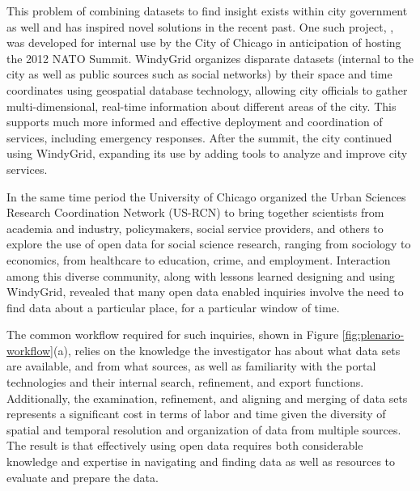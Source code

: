 \documentclass[11pt]{article}
\begin{document}
This problem of combining datasets to find insight exists within city government as well and has inspired novel solutions in the recent past. One such project, \cite{windygrid}, was developed for internal use by the City of Chicago in anticipation of hosting the 2012 NATO Summit. WindyGrid organizes disparate datasets (internal to the city as well as public sources such as social networks) by their space and time coordinates using geospatial database technology, allowing city officials to gather multi-dimensional, real-time information about different areas of the city. This supports much more informed and effective deployment and coordination of services, including emergency responses. After the summit, the city continued using WindyGrid, expanding its use by adding tools to analyze and improve city services.

In the same time period the University of Chicago \cite{urbanccd} organized the Urban Sciences Research Coordination Network (US-RCN) \cite{us-rcn} to bring together scientists from academia and industry, policymakers, social service providers, and others to explore the use of open data for social science research, ranging from sociology to economics, from healthcare to education, crime, and employment. Interaction among this diverse community, along with lessons learned designing and using WindyGrid, revealed that many open data enabled inquiries involve the need to find data about a particular place, for a particular window of time.

The common workflow required for such inquiries, shown in Figure \ref{fig:plenario-workflow}(a), relies on the knowledge the investigator has about what data sets are available, and from what sources, as well as familiarity with the portal technologies and their internal search, refinement, and export functions. Additionally, the examination, refinement, and aligning and merging of data sets represents a significant cost in terms of labor and time given the diversity of spatial and temporal resolution and organization of data from multiple sources. The result is that effectively using open data requires both considerable knowledge and expertise in navigating and finding data as well as resources to evaluate and prepare the data.
\end{document}
